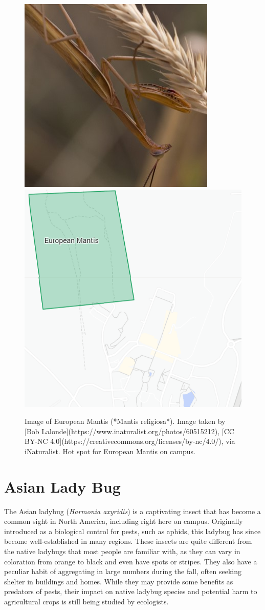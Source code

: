 \documentclass[
]{book}
\begin{document}
\begin{figure}

{\centering \includegraphics[width=0.49\linewidth,height=0.2\textheight]{insect_images/mantis_11} \includegraphics[width=0.49\linewidth,height=0.2\textheight]{insect_images/mantis_hotspot_11} 

}

\caption{Image of European Mantis (*Mantis religiosa*). Image taken by [Bob Lalonde](https://www.inaturalist.org/photos/60515212), [CC BY-NC 4.0](https://creativecommons.org/licenses/by-nc/4.0/), via iNaturalist. Hot spot for European Mantis on campus.}\label{fig:unnamed-chunk-7}
\end{figure}

\hypertarget{asian-lady-bug}{%
\section{Asian Lady Bug}\label{asian-lady-bug}}

The Asian ladybug (\emph{Harmonia axyridis}) is a captivating insect that has become a common sight in North America, including right here on campus. Originally introduced as a biological control for pests, such as aphids, this ladybug has since become well-established in many regions. These insects are quite different from the native ladybugs that most people are familiar with, as they can vary in coloration from orange to black and even have spots or stripes. They also have a peculiar habit of aggregating in large numbers during the fall, often seeking shelter in buildings and homes. While they may provide some benefits as predators of pests, their impact on native ladybug species and potential harm to agricultural crops is still being studied by ecologists.
\end{document}

